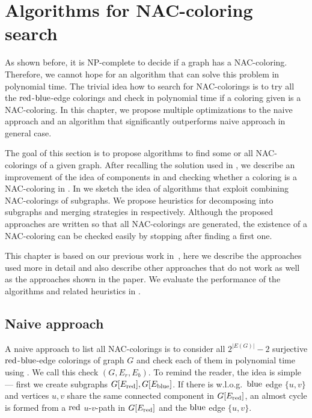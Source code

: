 \chapter{Algorithms for NAC-coloring search}%
\label{chapter:algo}

\begin{chapterabstract}

	As shown before, it is NP-complete to decide if a graph has a NAC-coloring.
	Therefore, we cannot hope for an algorithm that can solve this problem in polynomial time.
	The trivial idea how to search for NAC-colorings is to
	try all the \( \text{red} \)-\( \text{blue} \)-edge colorings
	and check in polynomial time if a coloring given is a NAC-coloring.
	In this chapter, we propose multiple optimizations to the naive approach
	and an algorithm that significantly outperforms naive approach in general case.

\end{chapterabstract}

The goal of this section is to propose algorithms to find some or all NAC-colorings of a given graph.
After recalling the solution used in \flexrilog{},
we describe an improvement of the idea of \trcon{} components in 
and checking whether a coloring is a NAC-coloring in .
In  we sketch the idea of algorithms that
exploit combining NAC-colorings of subgraphs.
We propose heuristics for decomposing into subgraphs and merging strategies
in  respectively.
Although the proposed approaches are written so that all NAC-colorings are generated,
the existence of a NAC-coloring can be checked easily by stopping after finding a first one.

This chapter is based on our previous work in~\cite{my_paper},
here we describe the approaches used more in detail
and also describe other approaches that do not work as well as the approaches
shown in the paper. We evaluate the performance
of the algorithms and related heuristics in .

\section{Naive approach}

A naive approach to list all NAC-colorings is to consider
all $2^{|E(G)|} - 2$ surjective \( \text{red} \)-\( \text{blue} \)-edge colorings of graph $G$
and check each of them in polynomial time using .
We call this check \IsNACColoring{}$(G, E_r, E_b)$.
To remind the reader, the idea is simple
--- first we create subgraphs \( G[E_{\text{red}}], G[E_{\text{blue}}] \).
If there is w.l.o.g.\ \( \text{blue} \) edge \( \{u, v\} \)
and vertices \( u, v \) share the same connected component in \( G[E_{\text{red}}] \),
an almost cycle is formed from a \( \text{red} \) \( u \)-\( v \)-path in \( G[E_{\text{red}}] \)
and the \( \text{blue} \) edge \( \{u, v\} \).

